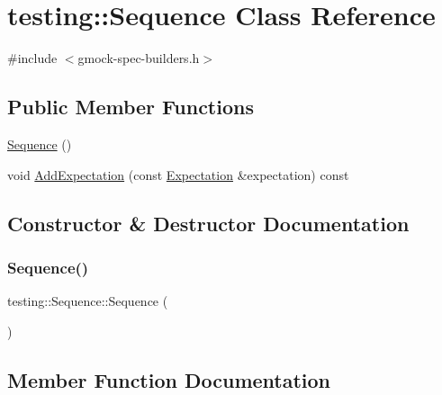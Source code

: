 \hypertarget{classtesting_1_1_sequence}{}\section{testing\+:\+:Sequence Class Reference}
\label{classtesting_1_1_sequence}


{\ttfamily \#include $<$gmock-\/spec-\/builders.\+h$>$}

\subsection*{Public Member Functions}
\begin{DoxyCompactItemize}
\item 
\hyperlink{classtesting_1_1_sequence_abde36441492d869e608175966f8f8c48}{Sequence} ()
\item 
void \hyperlink{classtesting_1_1_sequence_ac5b77b3b5b2e229ccbc13be1f3d17a9c}{Add\+Expectation} (const \hyperlink{classtesting_1_1_expectation}{Expectation} \&expectation) const
\end{DoxyCompactItemize}


\subsection{Constructor \& Destructor Documentation}
\mbox{\label{classtesting_1_1_sequence_abde36441492d869e608175966f8f8c48}} 
\subsubsection{\texorpdfstring{Sequence()}{Sequence()}}
{\footnotesize\ttfamily testing\+::\+Sequence\+::\+Sequence (\begin{DoxyParamCaption}{ }\end{DoxyParamCaption})\hspace{0.3cm}{\ttfamily [inline]}}



\subsection{Member Function Documentation}
\mbox{\label{classtesting_1_1_sequence_ac5b77b3b5b2e229ccbc13be1f3d17a9c}} 
